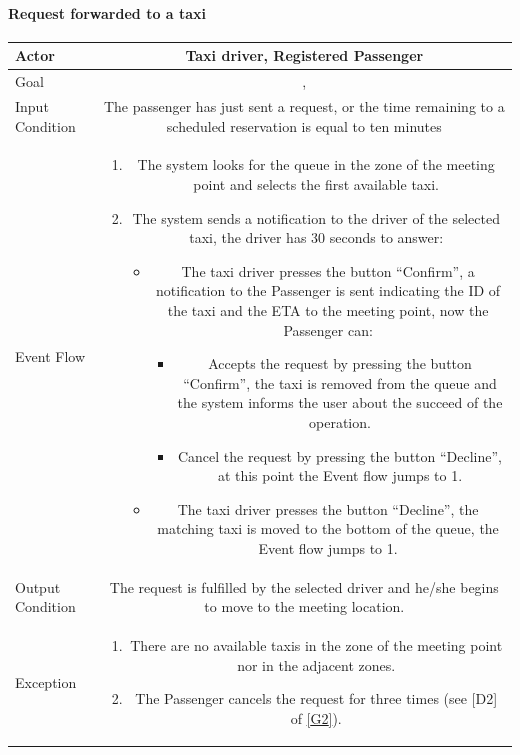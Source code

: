 \documentclass[a4paper,12pt]{article}%
\newcommand{\usecasetable}[6]{
\begin{center}
\def\arraystretch{1.5}
\begin{tabularx}{\textwidth}{|s|C|}
\hline
Actor & #1\\
\hline
Goal & #2\\
\hline
Input Condition & #3 \\
\hline
Event Flow & #4\\
\hline
Output Condition & #5\\
\hline
Exception & #6\\
\hline
\end{tabularx}
\end{center}
}
\begin{document}
\paragraph{Request forwarded to a taxi}
\usecasetable{Taxi driver, Registered Passenger}{, \nameref{goal3}}{The passenger has just sent a request, or the time remaining to a scheduled reservation is equal to ten minutes}
{
\begin{minipage}[b]{11cm}
\begin{enumerate}
\item The system looks for the queue in the zone of the meeting point and selects the first available taxi. 
\item The system sends a notification to the driver of the selected taxi, the driver has 30 seconds to answer:
\begin{itemize}
\item The taxi driver presses the button ``Confirm'', a notification to the Passenger is sent indicating the ID of the taxi and the ETA to the meeting point, now the Passenger can:
\begin{itemize}
\item Accepts the request by pressing the button ``Confirm'', the taxi is removed from the queue and the system informs the user about the succeed of the operation.
\item Cancel the request by pressing the button ``Decline'', at this point the Event flow jumps to 1.\end{itemize}
\item The taxi driver presses the button ``Decline'', the matching taxi is moved to the bottom of the queue, the Event flow jumps to 1.
\end{itemize}
\end{enumerate}
\end{minipage}
}
{The request is fulfilled by the selected driver and he/she begins to move to the meeting location.}
{
\begin{minipage}[b]{11cm}
\begin{enumerate}
\item There are no available taxis in the zone of the meeting point nor in the adjacent zones.
\item The Passenger cancels the request for three times (see [D2] of \hyperref[goal2]{{[}G2{]}}).
\end{enumerate}
\end{minipage}
}
\end{document}
